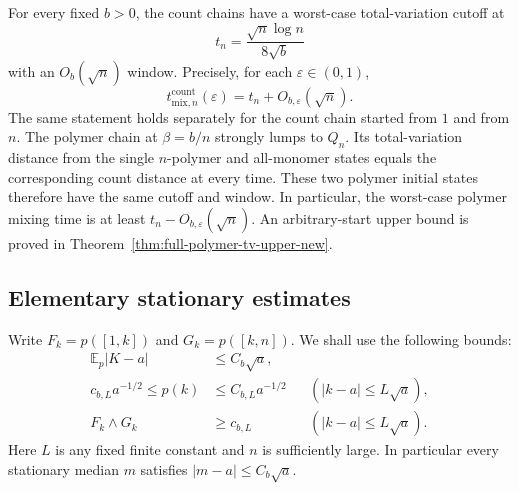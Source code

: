 \begin{theorem}\label{thm:count-cutoff}
For every fixed $b>0$, the count chains have a worst-case total-variation
cutoff at
\[
 t_n=\frac{\sqrt n\log n}{8\sqrt b}
\]
with an $O_b(\sqrt n)$ window. Precisely, for each $\varepsilon\in(0,1)$,
\[
 t^{\mathrm{count}}_{\mathrm{mix},n}(\varepsilon)
 =t_n+O_{b,\varepsilon}(\sqrt n).
\]
The same statement holds separately for the count chain started from $1$
and from $n$. The polymer chain at $\beta=b/n$ strongly lumps to $Q_n$. Its
total-variation distance from the single $n$-polymer and all-monomer states
equals the corresponding count distance at every time. These two polymer
initial states therefore have the same cutoff and window. In particular,
the worst-case polymer mixing time is at least
$t_n-O_{b,\varepsilon}(\sqrt n)$. An arbitrary-start upper bound is proved in
Theorem~\ref{thm:full-polymer-tv-upper-new}.
\end{theorem}

\subsection{Elementary stationary estimates}
Write $F_k=p([1,k])$ and $G_k=p([k,n])$. We shall use the following bounds:
\begin{align}
 \mathbb E_p|K-a|&\leq C_b\sqrt a,\label{eq:stationary-first-moment}\\
 c_{b,L}a^{-1/2}\leq p(k)&\leq C_{b,L}a^{-1/2}
       &&(|k-a|\leq L\sqrt a),\label{eq:stationary-local}\\
 F_k\wedge G_k&\geq c_{b,L}
       &&(|k-a|\leq L\sqrt a).\label{eq:stationary-central-masses}
\end{align}
Here $L$ is any fixed finite constant and $n$ is sufficiently large.
In particular every stationary median $m$ satisfies
$|m-a|\leq C_b\sqrt a$.

